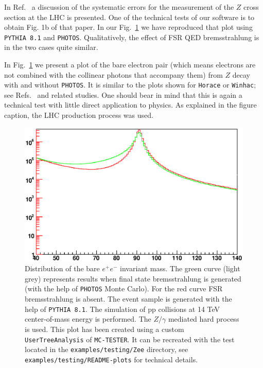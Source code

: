 \documentclass[]{Photos_interface_design}
\begin{document}
In Ref.~\cite{Adam:2008ge} a discussion of the systematic errors for the measurement of the $Z$ cross 
section at the LHC is presented. One of the technical tests of our software is to obtain
Fig. 1b of that paper. In our Fig.~\ref{fig:lineshape} we have 
reproduced that plot using {\tt PYTHIA 8.1} and {\tt PHOTOS}. Qualitatively, the effect
of FSR QED bremsstrahlung is in the two cases quite similar. 


In  Fig.~\ref{fig:lineshape} we present a plot of the bare electron pair 
(which means electrons are not combined with the collinear photons that accompany them) from $Z$
 decay with and without {\tt PHOTOS}. It is similar to
the plots shown for {\tt Horace} or {\tt Winhac}; see Refs.~\cite{CarloniCalame:2003ux,Winhac} and related
studies.
One should bear in mind that this is again a technical test with little 
direct application to physics. As explained in the figure caption, the LHC production process was used.
\begin{figure}[h!]
\centering
\includegraphics[scale=0.85]{lineshape.eps}
\caption{Distribution of the bare $e^+e^-$ invariant mass. The green curve 
(light grey) represents results when final state 
bremsstrahlung is generated (with the help of {\tt PHOTOS} Monte Carlo). For the red curve FSR 
bremsstrahlung is absent. The event sample is generated with the help of {\tt PYTHIA 8.1}.
The simulation of pp collisions at 14 TeV center-of-mass energy is performed.
The $Z/\gamma$ mediated hard process is used.
This plot has been created using a custom {\tt UserTreeAnalysis} of {\tt MC-TESTER}.
It can be recreated with the test located in the {\tt examples/testing/Zee} directory, see  {\tt examples/testing/README-plots} for technical details.
\label{fig:lineshape}
}
\end{figure}
\end{document}
